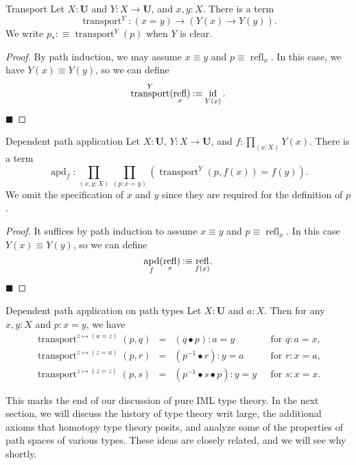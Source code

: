 \documentclass{article}
\renewcommand{\qed}{\hfill{\color{MPBthm}\( \blacksquare \)}}
\newcommand{\eql}{\mathbin{:\equiv}}
\newcommand{\U}{\mathbf{U}}
\newcommand{\tpi}[1]{\prod_{(#1)}}
\newcommand{\1}{\textbf{1}}
\newcommand{\0}{\mathbf{0}}
\newcommand{\2}{\textbf{2}}
\DeclareMathOperator{\refl}{refl}
\DeclareMathOperator{\transport}{transport}
\DeclareMathOperator{\id}{id}
\DeclareMathOperator{\apd}{apd}
\begin{document}
\begin{thm}{Transport}{} Let \( X : \U \) and \( Y : X \to \U \), and \( x, y : X \). There is a term
\[ \transport^{Y} : (x = y) \to (Y(x) \to Y(y)). \]
We write \( p_{\ast} \eql \transport^{Y}(p) \) when \( Y \) is clear.
\begin{proof}
	By path induction, we may assume \( x \equiv y \) and \( p \equiv \refl_{x} \). In this case, we have \( Y(x) \equiv Y(y) \), so we can define
	\[ \transport^{Y}(\refl_{x}) \eql \id_{Y(x)}.\vspace{-18pt} \] \qed\vspace{3pt}
\end{proof} \end{thm}
\begin{thm}{Dependent path application}{} Let \( X : \U \), \( Y : X \to \U \), and \( f : \tpi{x : X} Y(x) \). There is a term
\[ \apd_{f} : \tpi{x, y : X} \tpi{p : x = y} (\transport^{Y}(p, f(x)) = f(y)). \]
We omit the specification of \( x \) and \( y \) since they are required for the definition of \( p \).
\begin{proof}
	It suffices by path induction to assume \( x \equiv y \) and \( p \equiv \refl_{x} \). In this case \( Y(x) \equiv Y(y) \), so we can define
	\[ \apd_{f}(\refl_{x}) \eql {\refl_{f(x)}}.\vspace{-15pt} \] \qed\vspace{3pt}
\end{proof} \end{thm}
\begin{corollary}{Dependent path application on path types}{}
	Let \( X : \U \) and \( a : X \). Then for any \( x, y : X \) and \( p : x = y \), we have
	\[ \begin{array}{rcll}
		\transport^{z \mapsto (a = z)}(p, q) &=& (q \bullet p) : a = y & \text{ ~for } q : a = x, \\
		\transport^{z \mapsto (z = a)}(p, r) &=& (p^{-1} \bullet r) : y = a & \text{ ~for } r : x = a, \\
		\transport^{z \mapsto (z = z)}(p, s) &=& (p^{-1} \bullet s \bullet p) : y = y & \text{ ~for } s : x = x.
	\end{array} \]
\end{corollary}
This marks the end of our discussion of pure IML type theory. In the next section, we will discuss the history of type theory writ large, the additional axioms that homotopy type theory posits, and analyze some of the properties of path spaces of various types. These ideas are closely related, and we will see why shortly.
\end{document}
